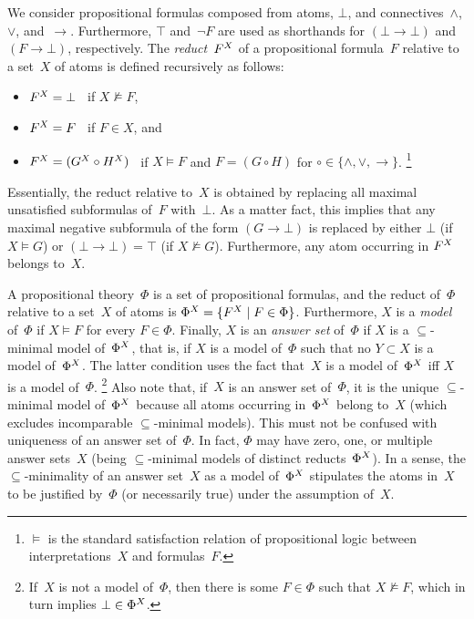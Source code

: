 We consider propositional formulas composed from atoms, $\bot$,
and connectives~$\wedge$, $\vee$, and~$\rightarrow$.
Furthermore, $\top$ and~$\neg F$ are used as shorthands for
$(\bot\rightarrow\bot)$ and $(F\rightarrow\bot)$, respectively.
The \emph{reduct}~$F^{X}$ of a propositional formula~$F$
relative to a set~$X$ of atoms is defined recursively as follows:
\begin{itemize}\addtolength{\itemsep}{-3pt}
\item $F^{X}=\bot$ ~if $X\not\models F$,
\item $F^{X}=F$ ~if $F\in X$, and
\item $F^{X}=(G^{X}\circ H^{X})$ ~if 
      $X\models F$ and $F=(G\circ H)$ for $\circ\in\{\wedge,\vee,\rightarrow\}$.%
\footnote{$\models$ is the standard satisfaction relation of propositional logic
  between interpretations~$X$ and formulas~$F$.}
\end{itemize}
Essentially, the reduct relative to~$X$ is obtained by replacing
all maximal unsatisfied subformulas of~$F$ with~$\bot$.
As a matter fact, this implies that any maximal negative subformula 
of the form $(G\rightarrow \bot)$ is replaced by either $\bot$ (if $X\models G$)
or $(\bot\rightarrow\bot)=\top$ (if $X\not\models G$).
Furthermore, any atom occurring in $F^{X}$ belongs to~$X$.

A propositional theory~$\Phi$ is a set of propositional formulas,
and the reduct of~$\Phi$
relative to a set~$X$ of atoms is
$\Phi^{X}=\{F^{X} \mid F\in\Phi\}$.
Furthermore, $X$ is a \emph{model} of~$\Phi$ if $X\models F$
for every $F\in\Phi$.
Finally, $X$ is an \emph{answer set} of~$\Phi$ if
$X$ is a $\subseteq$-minimal model of~$\Phi^{X}$, that is,
if $X$ is a model of~$\Phi$ such that no $Y\subset X$
is a model of~$\Phi^{X}$.
The latter condition uses the fact that~$X$ is a model of~$\Phi^{X}$
iff $X$ is a model of~$\Phi$.%
\footnote{If~$X$ is not a model of~$\Phi$, then 
  there is some $F\in\Phi$ such that $X\not\models F$,
  which in turn implies $\bot\in\Phi^{X}$.}
Also note that, if~$X$ is an answer set of~$\Phi$,
it is the unique $\subseteq$-minimal model of~$\Phi^{X}$
because all atoms occurring in~$\Phi^{X}$ belong to~$X$
(which excludes incomparable $\subseteq$-minimal models).
This must not be confused
with uniqueness of an answer set of~$\Phi$.
In fact, $\Phi$ may have zero, one,
or multiple answer sets~$X$ (being $\subseteq$-minimal models of
distinct reducts~$\Phi^{X}$).
In a sense, the $\subseteq$-minimality of an answer set~$X$ as a 
model of~$\Phi^{X}$ stipulates the atoms in~$X$ to be justified by~$\Phi$
(or necessarily true) under the assumption of~$X$.

